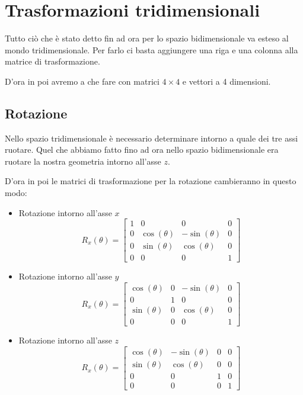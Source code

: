\chapter{Trasformazioni tridimensionali}\label{3D}
Tutto ci\`o che \`e stato detto fin ad ora per lo spazio bidimensionale va esteso al mondo
tridimensionale. Per farlo ci basta aggiungere una riga e una colonna alla matrice di
trasformazione.

D'ora in poi avremo a che fare con matrici $4 \times 4$ e vettori a 4 dimensioni.

\section{Rotazione}
Nello spazio tridimensionale \`e necessario determinare intorno a quale dei tre assi ruotare.
Quel che abbiamo fatto fino ad ora nello spazio bidimensionale era ruotare la nostra
geometria intorno all'asse $z$.

D'ora in poi le matrici di trasformazione per la rotazione cambieranno in questo modo:
\begin{itemize}
	\item Rotazione intorno all'asse $x$
	      \[
		      R_x(\theta) = \begin{bmatrix}
			      1 & 0            & 0             & 0 \\
			      0 & \cos(\theta) & -\sin(\theta) & 0 \\
			      0 & \sin(\theta) & \cos(\theta)  & 0 \\
			      0 & 0            & 0             & 1
		      \end{bmatrix}
	      \]
	\item Rotazione intorno all'asse $y$
	      \[
		      R_x(\theta) = \begin{bmatrix}
			      \cos(\theta) & 0 & -\sin(\theta) & 0 \\
			      0            & 1 & 0             & 0 \\
			      \sin(\theta) & 0 & \cos(\theta)  & 0 \\
			      0            & 0 & 0             & 1
		      \end{bmatrix}
	      \]
	\item Rotazione intorno all'asse $z$
	      \[
		      R_x(\theta) = \begin{bmatrix}
			      \cos(\theta) & -\sin(\theta) & 0 & 0 \\
			      \sin(\theta) & \cos(\theta)  & 0 & 0 \\
			      0            & 0             & 1 & 0 \\
			      0            & 0             & 0 & 1
		      \end{bmatrix}
	      \]
\end{itemize}

